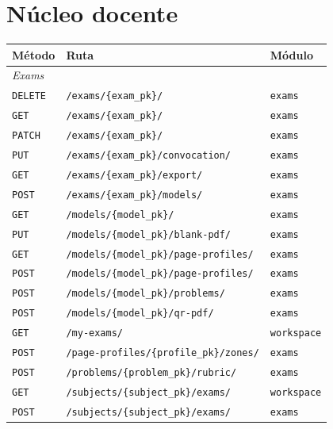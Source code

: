 \section*{Núcleo docente}

\begin{table}[htbp]
  \centering
  \footnotesize
  \begin{tabular}{llp{3.6cm}}
    \toprule
    \textbf{Método} & \textbf{Ruta} & \textbf{Módulo} \\
    \midrule
    \multicolumn{3}{l}{\textit{Exams}} \\
    \texttt{DELETE} & \texttt{/exams/\{exam\_pk\}/} & \texttt{exams} \\
    \texttt{GET} & \texttt{/exams/\{exam\_pk\}/} & \texttt{exams} \\
    \texttt{PATCH} & \texttt{/exams/\{exam\_pk\}/} & \texttt{exams} \\
    \texttt{PUT} & \texttt{/exams/\{exam\_pk\}/convocation/} & \texttt{exams} \\
    \texttt{GET} & \texttt{/exams/\{exam\_pk\}/export/} & \texttt{exams} \\
    \texttt{POST} & \texttt{/exams/\{exam\_pk\}/models/} & \texttt{exams} \\
    \texttt{GET} & \texttt{/models/\{model\_pk\}/} & \texttt{exams} \\
    \texttt{PUT} & \texttt{/models/\{model\_pk\}/blank-pdf/} & \texttt{exams} \\
    \texttt{GET} & \texttt{/models/\{model\_pk\}/page-profiles/} & \texttt{exams} \\
    \texttt{POST} & \texttt{/models/\{model\_pk\}/page-profiles/} & \texttt{exams} \\
    \texttt{POST} & \texttt{/models/\{model\_pk\}/problems/} & \texttt{exams} \\
    \texttt{POST} & \texttt{/models/\{model\_pk\}/qr-pdf/} & \texttt{exams} \\
    \texttt{GET} & \texttt{/my-exams/} & \texttt{workspace} \\
    \texttt{POST} & \texttt{/page-profiles/\{profile\_pk\}/zones/} & \texttt{exams} \\
    \texttt{POST} & \texttt{/problems/\{problem\_pk\}/rubric/} & \texttt{exams} \\
    \texttt{GET} & \texttt{/subjects/\{subject\_pk\}/exams/} & \texttt{workspace} \\
    \texttt{POST} & \texttt{/subjects/\{subject\_pk\}/exams/} & \texttt{exams} \\

\end{tabular}
\end{table}
